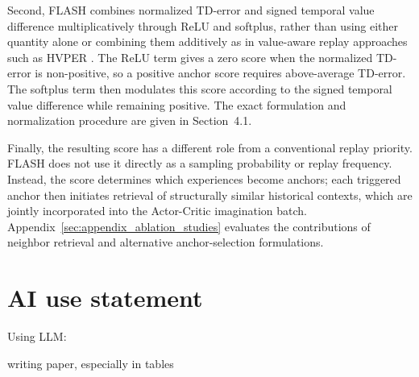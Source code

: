 \documentclass{article} %
\begin{document}
Second, FLASH combines normalized TD-error and signed temporal value difference multiplicatively through ReLU and softplus, rather than using either quantity alone or combining them additively as in value-aware replay approaches such as HVPER \citep{cao2019high}. The ReLU term gives a zero score when the normalized TD-error is non-positive, so a positive anchor score requires above-average TD-error. The softplus term then modulates this score according to the signed temporal value difference while remaining positive. The exact formulation and normalization procedure are given in Section~4.1.

Finally, the resulting score has a different role from a conventional replay priority. FLASH does not use it directly as a sampling probability or replay frequency. Instead, the score determines which experiences become anchors; each triggered anchor then initiates retrieval of structurally similar historical contexts, which are jointly incorporated into the Actor-Critic imagination batch. Appendix~\ref{sec:appendix_ablation_studies} evaluates the contributions of neighbor retrieval and alternative anchor-selection formulations.

\section{AI use statement}

Using LLM:


writing paper, especially in tables
\end{document}
